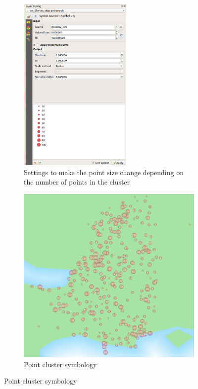 \begin{figure}[h!] %
	\begin{subfigure}{0.48\textwidth}
		\includegraphics[width=0.6\textwidth]{images/point_clustering_cluster_size.png}
		\caption{Settings to make the point size change depending on the number of points in the cluster}
		\label{ft_fig_firstfig3}
	\end{subfigure}\hspace*{\fill}
	\begin{subfigure}{0.48\textwidth}
		\includegraphics[width=1\textwidth]{images/point_cluster_map.png}
		\caption{Point cluster symbology}
		\label{ft_fig_firstfig3}
	\end{subfigure}
\end{figure}

